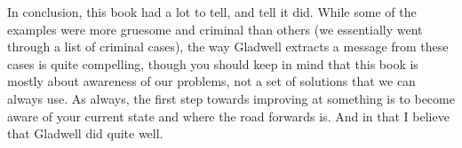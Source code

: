 In conclusion, this book had a lot to tell, and tell it did. While some of the examples were more gruesome and criminal than others (we essentially went through a list of criminal cases), the way Gladwell extracts a message from these cases is quite compelling, though you should keep in mind that this book is mostly about awareness of our problems, not a set of solutions that we can always use. As always, the first step towards improving at something is to become aware of your current state and where the road forwards is. And in that I believe that Gladwell did quite well.
